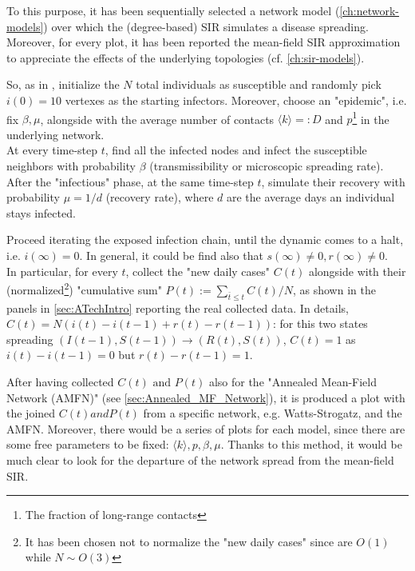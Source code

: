 \documentclass[a4paper,10pt,twoside]{book} %
\theoremstyle{definition}
\begin{document}
To this purpose, it has been sequentially selected a network model (\autoref{ch:network-models}) over which the (degree-based) SIR simulates a disease spreading. Moreover, for every plot, it has been reported the mean-field SIR approximation to appreciate the effects of the underlying topologies (cf. \autoref{ch:sir-models}).

So, as in \cite{Thurner::NetBasedExpl}, initialize the $N$ total individuals as susceptible and randomly pick $i(0) = 10$ vertexes as the starting infectors. Moreover, choose an "epidemic", i.e. fix $\beta, \mu$, alongside with the average number of contacts $\langle k \rangle =:D$ and $p$\footnote{The fraction of long-range contacts} in the underlying network. 
\\At every time-step $t$, find all the infected nodes and infect the susceptible neighbors with probability $\beta$ (transmissibility or microscopic spreading rate). After the "infectious" phase, at the same time-step $t$, simulate their recovery with probability $\mu = 1/d$ (recovery rate), where $d$ are the average days an individual stays infected.

\noindent{}

Proceed iterating the exposed infection chain, until the dynamic comes to a halt, i.e. $i(\infty)=0$. In general, it could be find also that $s(\infty)\neq0, r(\infty) \neq0$. 
\\In particular, for every $t$, collect the "new daily cases" $C(t)$ alongside with their (normalized\footnote{It has been chosen not to normalize the "new daily cases" since are $O(1)$ while $N\sim O(3)$}) "cumulative sum" $P(t):=\sum_{\bar{t}\leq t} C(t)/N$, as shown in the panels in \autoref{sec:ATechIntro} reporting the real collected data. In details, $C(t) = N(i(t) - i(t-1) + r(t) - r(t-1))$: for this two states spreading $(I(t-1),S(t-1)) \to (R(t),S(t))$, $C(t) = 1$ as $i(t)-i(t-1)=0$ but $r(t)-r(t-1) = 1$.

After having collected $C(t) \text{ and } P(t)$ also for the "Annealed Mean-Field Network (AMFN)" (see \autoref{sec:Annealed_MF_Network}), it is produced a plot with the joined $C(t) and P(t)$ from a specific network, e.g. Watts-Strogatz, and the AMFN. Moreover, there would be a series of plots for each model, since there are some free parameters to be fixed: $ \langle k \rangle, p, \beta,\mu$. Thanks to this method, it would be much clear to look for the departure of the network spread from the mean-field SIR.
\end{document}
